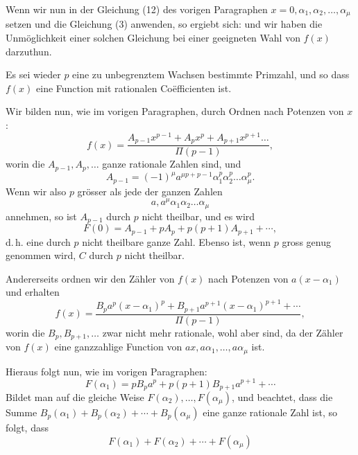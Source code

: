 
Wenn wir nun in der Gleichung (12) des vorigen Paragraphen $x=0,\alpha_1,\alpha_2,\ldots,\alpha_\mu$ setzen und die Gleichung (3) anwenden, so ergiebt sich:
und wir haben die Unmöglichkeit einer solchen Gleichung bei einer geeigneten Wahl von $f(x)$ darzuthun.

Es sei wieder $p$ eine zu unbegrenztem Wachsen bestimmte Primzahl, und
so dass $f(x)$ eine Function mit rationalen Coëfficienten ist.

Wir bilden nun, wie im vorigen Paragraphen, durch Ordnen nach Potenzen von $x$:
\[
f(x) = \dfrac{A_{p-1}x^{p-1} + A_px^p + A_{p+1}x^{p+1}\ldots}{\Pi(p-1)},
\]
worin die $A_{p-1},A_p,\ldots$ ganze rationale Zahlen sind, und
\[
A_{p-1} = (-1)^\mu a^{\mu p+p-1}\alpha_1^p\alpha_2^p\ldots\alpha_\mu^p.
\]
Wenn wir also $p$ grösser als jede der ganzen Zahlen
\[
a, a^\mu\alpha_1\alpha_2\ldots\alpha_\mu
\]
annehmen, so ist $A_{p-1}$ durch $p$ nicht theilbar, und es wird
\[
F(0) = A_{p-1} + pA_p + p(p+1)A_{p+1} + \cdots,
\]
d.\,h. eine durch $p$ nicht theilbare ganze Zahl. Ebenso ist, wenn $p$ gross genug genommen wird, $C$ durch $p$ nicht theilbar.

Andererseits ordnen wir den Zähler von $f(x)$ nach Potenzen von $a(x-\alpha_1)$ und erhalten
\[
f(x) = \dfrac{B_pa^p(x-\alpha_1)^p + B_{p+1}a^{p+1}(x-\alpha_1)^{p+1} + \cdots}{\Pi(p-1)},
\]
worin die $B_p,B_{p+1},\ldots$ zwar nicht mehr rationale, wohl aber  sind, da der Zähler von $f(x)$ eine ganzzahlige Function von $ax,a\alpha_1,\ldots,a\alpha_\mu$ ist.

Hieraus folgt nun, wie im vorigen Paragraphen:
\[
F(\alpha_1) = pB_pa^p + p(p+1)B_{p+1}a^{p+1} + \cdots
\]
Bildet man auf die gleiche Weise $F(\alpha_2),\ldots,F(\alpha_\mu)$, und beachtet, dass die Summe $B_p(\alpha_1)+B_p(\alpha_2)+\cdots+B_p(\alpha_\mu)$ eine ganze rationale Zahl ist, so folgt, dass
\[
F(\alpha_1) + F(\alpha_2) + \cdots + F(\alpha_\mu)
\]

